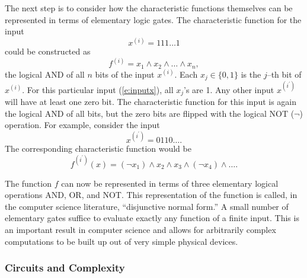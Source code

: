 The next step is to consider how the characteristic functions themselves
can be represented in terms of elementary logic gates.
The characteristic function for the input
\begin{equation}
x^{(i)} = 111\ldots1
\label{e:inputx}
\end{equation}
could be constructed as
\begin{equation}
f^{(i)} = x_1 \wedge x_2 \wedge \ldots\wedge x_n,
\end{equation}
the logical AND of all $n$ bits of the input $x^{(i)}$.
Each $x_j\in\lbrace 0,1\rbrace$ is the $j$--th bit of $x^{(i)}$.  
For this particular input (\ref{e:inputx}), all $x_j$'s are 1.
Any other input $x^{(i^\prime )}$ will have at least one zero bit.  
The characteristic function for this input is again the logical
AND of all bits, but the zero bits are flipped with the logical
NOT ($\neg$) operation.  For example, consider the input
\begin{equation}
x^{(i^\prime )} = 0110\ldots.
\end{equation}
The corresponding characteristic function would be 
\begin{equation}
f^{(i^\prime )}(x) = (\neg x_1 )\wedge x_2\wedge x_3\wedge (\neg x_4 )
\wedge\ldots.
\end{equation}

The function $f$ can now be represented in terms of three elementary
logical operations AND, OR, and NOT.  This representation of the 
function is called, in the computer science literature, ``disjunctive
normal form.''
A small number of elementary gates suffice to evaluate
exactly any function of a finite input.  This is an important result
in computer science and allows for arbitrarily complex computations
to be built up out of very simple physical devices.

\subsubsection{Circuits and Complexity}

